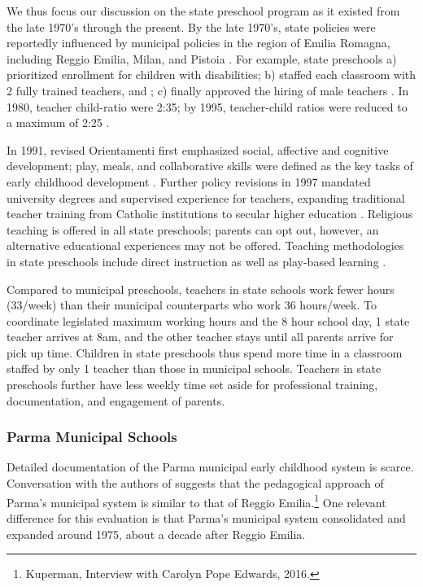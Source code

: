We thus focus our discussion on the state preschool program as it existed from the late 1970's through the present. By the late 1970's, state policies were reportedly influenced by municipal policies in the region of Emilia Romagna, including Reggio Emilia, Milan, and Pistoia \citep{OECD_2001_Italy-Country-Note}. For example, state preschools a) prioritized enrollment for children with disabilities; b) staffed each classroom with 2 fully trained teachers, and ; c) finally approved the hiring of male teachers \citep{Hohnerlein_2015_Development-and-DiffusionEnrollment}. In 1980, teacher child-ratio were 2:35; by 1995, teacher-child ratios were reduced to a maximum of 2:25 \citep{Hohnerlein_2009_Paradox-Public-Preschools}. 

In 1991, revised Orientamenti first emphasized social, affective and cognitive development; play, meals, and collaborative skills were defined as the key tasks of early childhood development \citep{Corsaro_1996_Early-Edu}. Further policy revisions in 1997 mandated university degrees and supervised experience for teachers, expanding traditional teacher training from Catholic institutions to secular higher education \citep{Ghedini_2001_Ital-Natl-Policy}. Religious teaching is offered in all state preschools; parents can opt out, however, an alternative educational experiences may not be offered. Teaching methodologies in state preschools include direct instruction as well as play-based learning \citep{CEHD_2016_Historical-Analysis}.

Compared to municipal preschools, teachers in state schools work fewer hours (33/week) than their municipal counterparts who work 36 hours/week. To coordinate legislated maximum working hours and the 8 hour school day, 1 state teacher arrives at 8am, and the other teacher stays until all parents arrive for pick up time. Children in state preschools thus spend more time in a classroom staffed by only 1 teacher than those in municipal schools. Teachers in state preschools further have less weekly time set aside for professional training, documentation, and engagement of parents.

\subsubsection{Parma Municipal Schools}

Detailed documentation of the Parma municipal early childhood system is scarce. Conversation with the authors of \citet{Edwards-etal-eds_1998_Hundred-Languages} suggests that the pedagogical approach of Parma's municipal system is similar to that of Reggio Emilia.\footnote{Kuperman, Interview with Carolyn Pope Edwards, 2016.} One relevant difference for this evaluation is that Parma's municipal system consolidated and expanded around 1975, about a decade after Reggio Emilia. 

